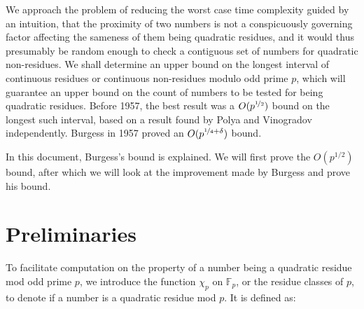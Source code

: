 \documentclass{article}
\newcommand{\ignore}[1]{}
\begin{document}
We approach the problem of reducing the worst case time complexity guided by an intuition, that the proximity of two numbers is not a conspicuously governing factor affecting the sameness of them being quadratic residues\ignore{, without it affecting the correctness of the result}, and it would thus presumably be random enough to check a contiguous set of numbers for quadratic non-residues. We shall determine an upper bound on the longest interval of continuous residues or continuous non-residues modulo odd prime $p$, which will guarantee an upper bound on the count of numbers to be tested for being quadratic residues. Before 1957, the best result was a $O(p^{\nicefrac{1}{2}})$ bound on the longest such interval, based on a result found by Polya \cite{polya} and Vinogradov \cite{vinogradov} independently. Burgess \cite{burgess} in 1957 proved an $O(p^{\nicefrac{1}{4}+\delta})$ bound.

In this document, Burgess's bound is explained. We will first prove the $O(p^{1/2})$ bound, after which we will look at the improvement made by Burgess and prove his bound.

\section{Preliminaries}

To facilitate computation on the property of a number being a quadratic residue mod odd prime $p$, we introduce the function $\chi_p$ on $\mathbb{F}_p$, or the residue classes of $p$, to denote if a number is a quadratic residue mod $p$. It is defined as:
\end{document}
